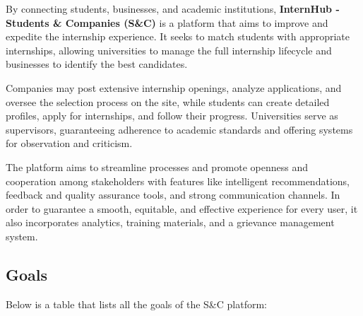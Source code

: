 By connecting students, businesses, and academic institutions, \textbf{InternHub - Students \& Companies (S&C)} is a platform that aims to improve and expedite the internship experience. It seeks to match students with appropriate internships, allowing universities to manage the full internship lifecycle and businesses to identify the best candidates.

Companies may post extensive internship openings, analyze applications, and oversee the selection process on the site, while students can create detailed profiles, apply for internships, and follow their progress. Universities serve as supervisors, guaranteeing adherence to academic standards and offering systems for observation and criticism.

The platform aims to streamline processes and promote openness and cooperation among stakeholders with features like intelligent recommendations, feedback and quality assurance tools, and strong communication channels. In order to guarantee a smooth, equitable, and effective experience for every user, it also incorporates analytics, training materials, and a grievance management system.

\subsection{Goals}
\label{subsec:goals}%
\setcounter{g}{1}
\newcommand{\cg}{\theg\stepcounter{g}}

Below is a table that lists all the goals of the S\&C platform:

